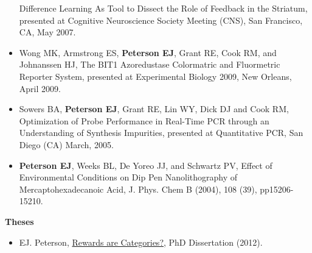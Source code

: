 \begin{itemize}
  Difference Learning As Tool to Dissect the Role of Feedback in the
  Striatum, presented at Cognitive Neuroscience Society Meeting (CNS),
  San Francisco, CA, May 2007.
\item
  Wong MK, Armstrong ES, \textbf{Peterson EJ}, Grant RE, Cook RM, and
  Johnanssen HJ, The BIT1 Azoredustase Colormatric and Fluormetric
  Reporter System, presented at Experimental Biology 2009, New Orleans,
  April 2009.
\item
  Sowers BA, \textbf{Peterson EJ}, Grant RE, Lin WY, Dick DJ and Cook
  RM, Optimization of Probe Performance in Real-Time PCR through an
  Understanding of Synthesis Impurities, presented at Quantitative PCR,
  San Diego (CA) March, 2005.
\item
  \textbf{Peterson EJ}, Weeks BL, De Yoreo JJ, and Schwartz PV, Effect
  of Environmental Conditions on Dip Pen Nanolithography of
  Mercaptohexadecanoic Acid, J. Phys. Chem B (2004), 108 (39),
  pp15206-15210.
\end{itemize}

\textbf{Theses}

\begin{itemize}
\tightlist
\item
  EJ. Peterson,
  \href{https://github.com/parenthetical-e/dissertation}{Rewards are
  Categories?}, PhD Dissertation (2012).
\end{itemize}
